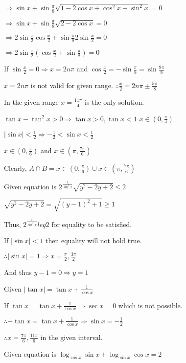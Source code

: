   $\Rightarrow \sin x + \sin\frac{\pi}{8}\sqrt{1 - 2\cos x + \cos^2x + \sin^2x} = 0$

  $\Rightarrow \sin x + \sin\frac{\pi}{8}\sqrt{2 - 2\cos x} = 0$

  $\Rightarrow 2\sin\frac{x}{2}\cos\frac{x}{2} + \sin\frac{\pi}{8}2\sin\frac{x}{2} = 0$

  $\Rightarrow 2\sin\frac{x}{2}\left(\cos\frac{x}{2} + \sin\frac{\pi}{8}\right) = 0$

  If $\sin\frac{x}{2} = 0 \Rightarrow x = 2n\pi$ and $\cos\frac{x}{2} = -\sin\frac{\pi}{8} = \sin\frac{9\pi}{8}$

  $x = 2n\pi$ is not valid for given range. $\therefore \frac{x}{2} = 2n\pi\pm\frac{5\pi}{8}$

  In the given range $x = \frac{11\pi}{4}$ is the only solution.

\item $\tan x - \tan^2x > 0 \Rightarrow \tan x > 0, \tan x < 1$ $x \in \left(0, \frac{\pi}{4}\right)$

  $|\sin x|< \frac{1}{2} \Rightarrow -\frac{1}{2}< \sin x < \frac{1}{2}$

  $x\in \left(0, \frac{\pi}{6}\right)$ and $x\in \left(\pi, \frac{7\pi}{6}\right)$

  Clearly, $A\cap B = x\in \left(0, \frac{\pi}{6}\right) \cup x\in \left(\pi, \frac{7\pi}{6}\right)$

\item Given equation is $2^{\frac{1}{\sin^2x}}\sqrt{y^2 - 2y + 2}\leq 2$

  $\sqrt{y^2 - 2y + 2} = \sqrt{(y - 1)^2 + 1} \geq 1$

  Thus, $2^{\frac{1}{\sin^2x}} leq 2$ for equality to be satisfied.

  If $|\sin x| < 1$ then equality will not hold true.

  $\therefore |\sin x| = 1 \Rightarrow x = \frac{\pi}{2}, \frac{3\pi}{2}$

  And thus $y - 1 = 0 \Rightarrow y = 1$

\item Given $|\tan x| = \tan x + \frac{1}{\cos x}$

  If $\tan x = \tan x + \frac{1}{\cos x} \Rightarrow \sec x = 0$ which is not possible.

  $\therefore -\tan x = \tan x + \frac{1}{\cos x} \Rightarrow \sin x = -\frac{1}{2}$

  $\therefore x = \frac{7\pi}{6}, \frac{11\pi}{6}$ in the given interval.

\item Given equation is $\log_{\cos x}\sin x + \log_{\sin x}\cos x = 2$

